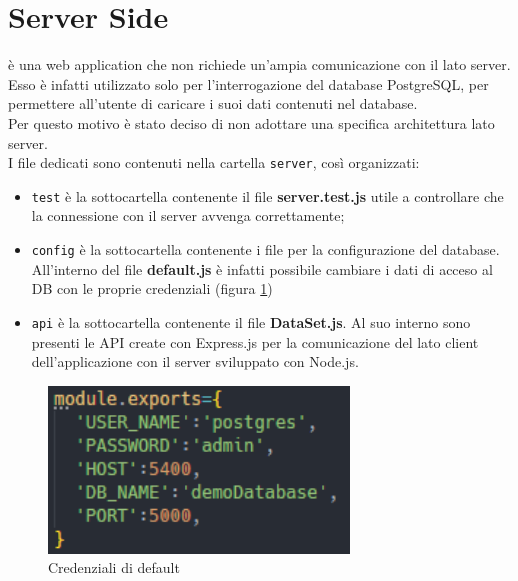 \section{Server Side}
\NomeProgetto{} è una web application che non richiede un'ampia comunicazione con il lato server. Esso è infatti utilizzato solo per l'interrogazione del database PostgreSQL, per permettere all'utente di caricare i suoi dati contenuti nel database. \\
Per questo motivo è stato deciso di non adottare una specifica architettura lato server. \\
I file dedicati sono contenuti nella cartella \texttt{server}, così organizzati:
\begin{itemize}
	\item \texttt{test} è la sottocartella contenente il file \textbf{server.test.js} utile a controllare che la connessione con il server avvenga correttamente; 
	\item \texttt{config} è la sottocartella contenente i file per la configurazione del database. All'interno del file \textbf{default.js} è infatti possibile cambiare i dati di acceso al DB con le proprie credenziali (figura \ref{config})
	\item \texttt{api} è la sottocartella contenente il file \textbf{DataSet.js}. Al suo interno sono presenti le API create con Express.js per la comunicazione del lato client dell'applicazione con il server sviluppato con Node.js.
\end{itemize}

\begin{figure}[hb]
\includegraphics[width=8cm]{Images/credenziali}
\centering
\caption{Credenziali di default}
\label{config}
\end{figure}